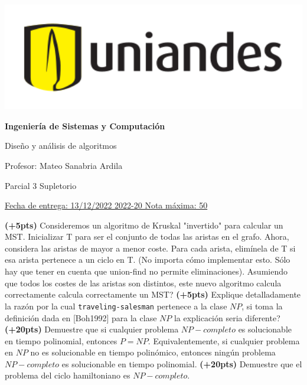 \documentclass[12pt, a4paper]{exam}
\begin{document}
	\noindent
	\begin{minipage}[l]{0.1\textwidth}
		\noindent
		\includegraphics[width=1.8\textwidth]{Logosimbolo-uniandes_horizontal.png}
	\end{minipage}
\hfill
\begin{minipage}[c]{0.8\textwidth}
	\begin{center}
		{\large \textbf{Ingeniería de Sistemas y Computación} \par
		\large	Diseño y análisis de algoritmos	\par
		\small  Profesor: Mateo Sanabria Ardila	\par
		\small  Parcial 3	Supletorio\par
		}
	\end{center}
\end{minipage}
\par
\vspace{0.2in}
\noindent
\uline{Fecha de entrega: 13/12/2022 	\hfill  2022-20		\hfill Nota máxima: 50}
\par 
\vspace{0.15in}

\begin{questions}
	\pointsdroppedatright

    \question \textbf{(+5pts)} Consideremos un algoritmo de Kruskal "invertido" para calcular un MST. Inicializar T para ser el conjunto de todas las aristas en el grafo. Ahora, considera las aristas de mayor a menor coste. Para cada arista, elimínela de T si esa arista pertenece a un ciclo en T. (No importa cómo implementar esto. Sólo hay que tener en cuenta que union-find no permite eliminaciones). Asumiendo que todos los costes de las aristas son distintos, este nuevo algoritmo calcula correctamente calcula correctamente un MST?
    \question \textbf{(+5pts)} Explique detalladamente la razón por la cual \texttt{traveling-salesman} pertenece a la clase $NP$, si toma la definición dada en [Boh1992] para la clase $NP$ la explicación seria diferente?
    \question  \textbf{(+20pts)} Demuestre que si cualquier problema $NP-completo$ es solucionable en tiempo polinomial, entonces $P=NP$. Equivalentemente, si cualquier problema en $NP$ no es solucionable en tiempo polinómico, entonces ningún problema $NP-completo$ es solucionable en tiempo polinomial.
    \question \textbf{(+20pts)} Demuestre que el problema del ciclo hamiltoniano es $NP-completo$.
\end{questions}
\end{document}
